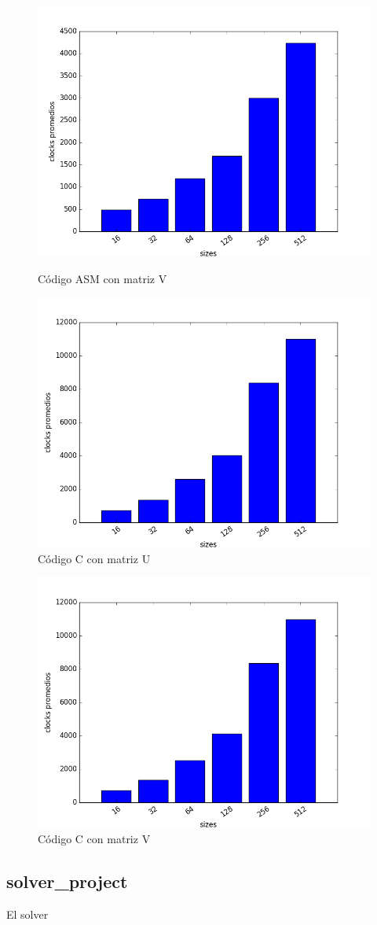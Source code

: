 \pagebreak

\begin{figure}[h]
  \centering
  	\includegraphics[width=.6\linewidth]{ClocksASMV.png}
  	\caption{Código ASM con matriz V}
  	\label{fig:ASMV}
  \centering
  	\includegraphics[width=.6\linewidth]{ClocksCU.png}
  	\caption{Código C con matriz U}
  	\label{fig:CU}
\end{figure}

\begin{figure}[h]
  \centering
  	\includegraphics[width=.6\linewidth]{ClocksCV.png}
  	\caption{Código C con matriz V}
  	\label{fig:CV}
\end{figure}

\pagebreak

\subsection{solver\_project}

El solver 